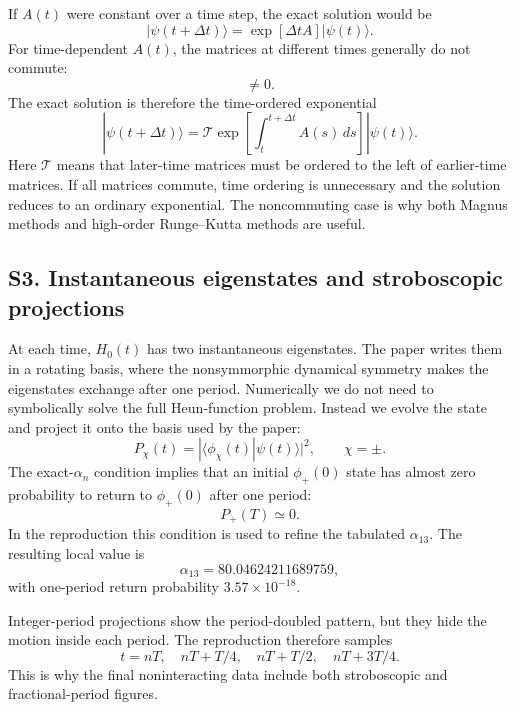 \documentclass[aps,pra,preprint,superscriptaddress,nofootinbib]{revtex4-2}
\begin{document}
If \(A(t)\) were constant over a time step, the exact solution would be
\begin{equation}
|\psi(t+\Delta t)\rangle=\exp[\Delta t A]|\psi(t)\rangle.
\end{equation}
For time-dependent \(A(t)\), the matrices at different times generally do not commute:
\begin{equation}
[A(t_1),A(t_2)]\neq0.
\end{equation}
The exact solution is therefore the time-ordered exponential
\begin{equation}
|\psi(t+\Delta t)\rangle
=\mathcal{T}\exp\left[\int_t^{t+\Delta t} A(s)\,ds\right]|\psi(t)\rangle.
\end{equation}
Here \(\mathcal{T}\) means that later-time matrices must be ordered to the left of earlier-time matrices. If all matrices commute, time ordering is unnecessary and the solution reduces to an ordinary exponential. The noncommuting case is why both Magnus methods and high-order Runge--Kutta methods are useful.

\subsection*{S3. Instantaneous eigenstates and stroboscopic projections}

At each time, \(H_0(t)\) has two instantaneous eigenstates. The paper writes them in a rotating basis, where the nonsymmorphic dynamical symmetry makes the eigenstates exchange after one period. Numerically we do not need to symbolically solve the full Heun-function problem. Instead we evolve the state and project it onto the basis used by the paper:
\begin{equation}
P_\chi(t)=|\langle \phi_\chi(t)|\psi(t)\rangle|^2,\qquad \chi=\pm.
\end{equation}
The exact-\(\alpha_n\) condition implies that an initial \(\phi_+(0)\) state has almost zero probability to return to \(\phi_+(0)\) after one period:
\begin{equation}
P_+(T)\simeq 0.
\end{equation}
In the reproduction this condition is used to refine the tabulated \(\alpha_{13}\). The resulting local value is
\begin{equation}
\alpha_{13}=80.04624211689759,
\end{equation}
with one-period return probability \(3.57\times10^{-18}\).

Integer-period projections show the period-doubled pattern, but they hide the motion inside each period. The reproduction therefore samples
\begin{equation}
t=nT,\quad nT+T/4,\quad nT+T/2,\quad nT+3T/4.
\end{equation}
This is why the final noninteracting data include both stroboscopic and fractional-period figures.
\end{document}
